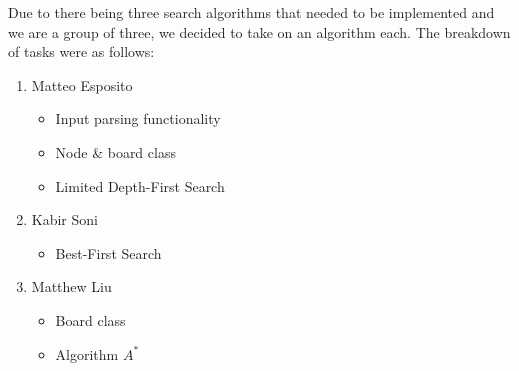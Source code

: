 \documentclass[runningheads]{llncs}
\begin{document}
Due to there being three search algorithms that needed to be implemented and we are a group of three, we decided to take on an algorithm each. The breakdown of tasks were as follows:

\begin{enumerate}
    \item Matteo Esposito
    \begin{itemize}
        \item Input parsing functionality
        \item Node \& board class
        \item Limited Depth-First Search
    \end{itemize}
    \item Kabir Soni
    \begin{itemize}
        \item Best-First Search
    \end{itemize}
    \item Matthew Liu
    \begin{itemize}
        \item Board class
        \item Algorithm $A^{*}$
    \end{itemize}
\end{enumerate}


\end{document}
